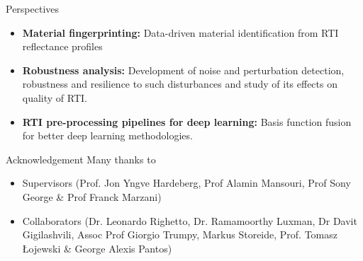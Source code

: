 \documentclass{beamer}
\begin{document}
\begin{frame}{Perspectives}
\begin{itemize}
    \item<1-> \textbf{Material fingerprinting:} Data-driven material identification from RTI reflectance profiles
    \item<2-> \textbf{Robustness analysis:}  Development of noise and perturbation detection, robustness and resilience to such disturbances and study of its effects on quality of RTI.
    \item<3-> \textbf{RTI pre-processing pipelines for deep learning:} Basis function fusion for better deep learning methodologies.
\end{itemize}
\end{frame}

\begin{frame}{Acknowledgement}
    Many thanks to 
    \begin{itemize}
        \item Supervisors (Prof. Jon Yngve Hardeberg, Prof Alamin Mansouri, Prof Sony George \& Prof Franck Marzani)
        \item Collaborators (Dr. Leonardo Righetto, Dr. Ramamoorthy Luxman, Dr Davit Gigilashvili, Assoc Prof Giorgio Trumpy, Markus Storeide, Prof. Tomasz Łojewski \& George Alexis Pantos)
    \end{itemize}
\end{frame}




\end{document}
